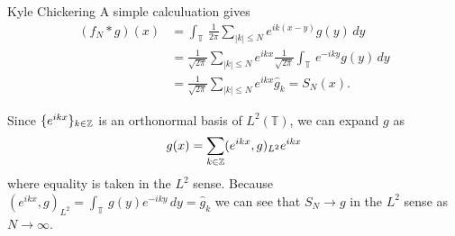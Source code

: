 

\begin{solution}{Kyle Chickering}
	A simple calculuation gives
	\begin{align*}
		(f_N*g)(x) &= \int_{\mathbb{T}}\,\frac{1}{2\pi}\sum_{|k|\leqslant N}e^{ik(x-y)}g(y)\,dy \\
                   &= \frac{1}{\sqrt{2\pi}}\sum_{|k|\leqslant N}e^{ikx}\frac{1}{\sqrt{2\pi}}\int_{\mathbb{T}}\,e^{-iky}g(y)\,dy \\
                   &= \frac{1}{\sqrt{2\pi}}\sum_{|k|\leqslant N}e^{ikx}\hat{g}_k = S_N(x).
	\end{align*}

	Since $\{e^{ikx}\}_{k\in \mathbb{Z}}$ is an orthonormal basis of $L^2(\mathbb{T})$, we can expand $g$ as
    \[ g(x) = \sum_{k\in \mathbb{Z}}(e^{ikx},g)_{L^2}e^{ikx} \]
	where equality is taken in the $L^2$ sense.
    Because $(e^{ikx},g)_{L^2}=\int_{\mathbb{T}}\,g(y)e^{-iky}\,dy=\hat{g}_k$ we can see that $S_N\rightarrow g$ in the $L^2$ sense as $N\rightarrow\infty$.
\end{solution}


